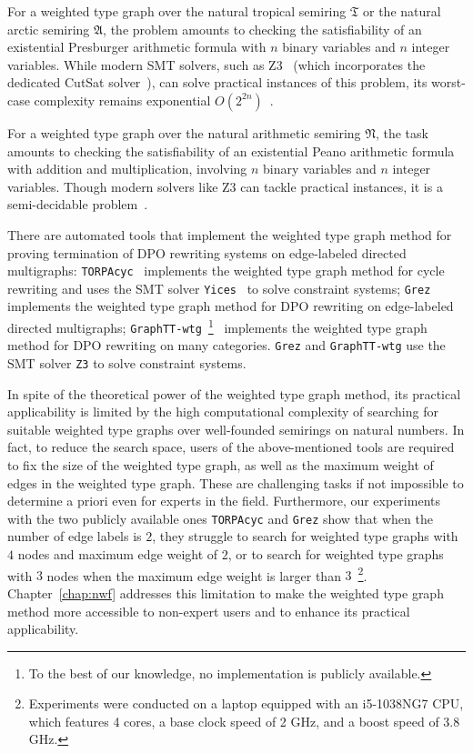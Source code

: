     For a weighted type graph over the natural tropical semiring $\mathfrak{T}$ or the natural arctic semiring $\mathfrak{A}$, the problem amounts to
    checking the satisfiability of an existential Presburger arithmetic formula with $n$ binary variables and $n$ integer variables.
    While modern SMT solvers, such as Z3~\cite{de2008z3} (which incorporates the dedicated CutSat solver~\cite{z3ilp_cutsat}), can solve practical instances of this problem, its worst-case complexity remains exponential \( O(2^{2n}) \)~\cite{arithmetic2024z3}.

     For a weighted type graph over the natural arithmetic semiring $\mathfrak{N}$, the task amounts to
     checking the satisfiability of an existential Peano arithmetic formula with addition and multiplication, involving $n$ binary variables and $n$ integer variables. Though modern solvers like Z3 can tackle practical instances, it is a semi-decidable problem~\cite{matiyasevivc2003enumerable}.

    There are automated tools that implement the weighted type graph method for proving termination of DPO rewriting systems on edge-labeled directed multigraphs:  
    \texttt{TORPAcyc}~\cite{TORPAcyc} implements the weighted type graph method for cycle rewriting and uses the SMT solver \texttt{Yices}~\cite{yices} to solve constraint systems;
    \texttt{Grez}~\cite{grez} implements the weighted type graph method for DPO rewriting on edge-labeled directed multigraphs; \texttt{GraphTT-wtg}~\footnote{To the best of our knowledge, no implementation is publicly available.}~\cite{endrullis2024generalized_arxiv_v3} implements the weighted type graph method for DPO rewriting on many categories.
    \texttt{Grez} and \texttt{GraphTT-wtg}  
    use  the SMT solver \texttt{Z3} to solve constraint systems.

    In spite of the theoretical power of the weighted type graph method, its practical applicability is limited by the high computational complexity of searching for suitable weighted type graphs over well-founded semirings on 
    natural numbers. In fact, to reduce the search space, users of the above-mentioned tools are required
     to fix the size of the weighted type graph, as well as the maximum weight of edges in the weighted type graph. These are challenging tasks if not impossible to determine a priori even for experts in the field. 
    Furthermore, our experiments with the two publicly available ones \texttt{TORPAcyc} and \texttt{Grez} show that when the number of edge labels is $2$, they struggle to search for weighted type graphs with $4$ nodes and maximum edge weight of $2$, or to search for weighted type graphs with $3$ nodes when the maximum edge weight is larger than $3$~\footnote{Experiments were conducted on a laptop equipped with an i5-1038NG7 CPU, which features 4 cores, a base clock speed of 2 GHz, and a boost speed of 3.8 GHz.}. 
   Chapter~\ref{chap:nwf} addresses this limitation to make the weighted type graph method more accessible to non-expert users and to enhance its practical applicability.

